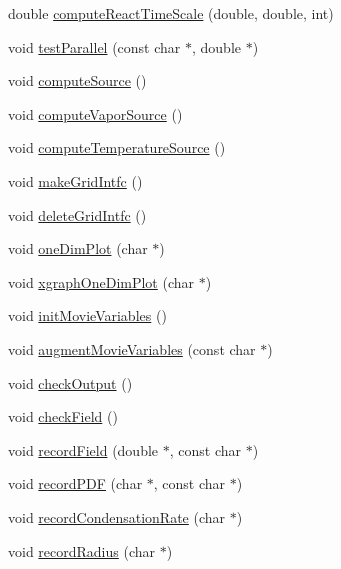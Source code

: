 \begin{DoxyCompactItemize}
\item 
double \hyperlink{class_v_c_a_r_t_e_s_i_a_n_ab36f8a386f97510ebaf0b265d19ab717}{compute\+React\+Time\+Scale} (double, double, int)
\item 
void \hyperlink{class_v_c_a_r_t_e_s_i_a_n_a38fb48fa7f2678244fa329614696035f}{test\+Parallel} (const char $\ast$, double $\ast$)
\item 
void \hyperlink{class_v_c_a_r_t_e_s_i_a_n_a2b7bcac50f260d227022fba537918796}{compute\+Source} ()
\item 
void \hyperlink{class_v_c_a_r_t_e_s_i_a_n_a0270ac08dec314f15b576de538fd5fb0}{compute\+Vapor\+Source} ()
\item 
void \hyperlink{class_v_c_a_r_t_e_s_i_a_n_a990822d5f8b3b9545498a48bf16e0d9a}{compute\+Temperature\+Source} ()
\item 
void \hyperlink{class_v_c_a_r_t_e_s_i_a_n_a65d75de4b4e0f7d99fc36dcef0468485}{make\+Grid\+Intfc} ()
\item 
void \hyperlink{class_v_c_a_r_t_e_s_i_a_n_ad424576a86fa94d5402baa48eb595876}{delete\+Grid\+Intfc} ()
\item 
void \hyperlink{class_v_c_a_r_t_e_s_i_a_n_ac6eaa33fdba82c49f20e2b8112291988}{one\+Dim\+Plot} (char $\ast$)
\item 
void \hyperlink{class_v_c_a_r_t_e_s_i_a_n_ab1cb8ee5dd6af59d8f085bc52f0fe9c5}{xgraph\+One\+Dim\+Plot} (char $\ast$)
\item 
void \hyperlink{class_v_c_a_r_t_e_s_i_a_n_a9e8400e77c8d84ea2e44f9ad680e9325}{init\+Movie\+Variables} ()
\item 
void \hyperlink{class_v_c_a_r_t_e_s_i_a_n_a175d0e3946301624d5a4729a9328f121}{augment\+Movie\+Variables} (const char $\ast$)
\item 
void \hyperlink{class_v_c_a_r_t_e_s_i_a_n_a8056a0f18a7ee7d286ffc0822dc7f7ba}{check\+Output} ()
\item 
void \hyperlink{class_v_c_a_r_t_e_s_i_a_n_ad6f6dfe8c8ed9b1d62f891e712103576}{check\+Field} ()
\item 
void \hyperlink{class_v_c_a_r_t_e_s_i_a_n_a238f5e802f1596791b716afd76ed73b4}{record\+Field} (double $\ast$, const char $\ast$)
\item 
void \hyperlink{class_v_c_a_r_t_e_s_i_a_n_a44acbb9b0ba8e6754b4558e21b3e46b6}{record\+P\+DF} (char $\ast$, const char $\ast$)
\item 
void \hyperlink{class_v_c_a_r_t_e_s_i_a_n_a767e2c84c9d0aaefe574b2d75ba41f62}{record\+Condensation\+Rate} (char $\ast$)
\item 
void \hyperlink{class_v_c_a_r_t_e_s_i_a_n_aa9f1f2780acb99f06d77c57ba1dfdc0a}{record\+Radius} (char $\ast$)

\end{DoxyCompactItemize}
